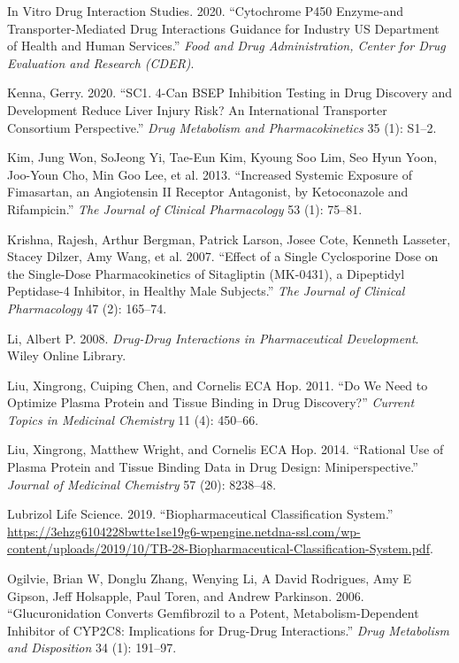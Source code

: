 \documentclass[
  11pt,
  krantz2, a4paper, twoside]{krantz}
\newlength{\cslhangindent}
\newenvironment{CSLReferences}[2] %
 {\begin{list}{}{%
  \setlength{\itemindent}{0pt}
  \setlength{\leftmargin}{0pt}
  \setlength{\parsep}{0pt}
  \ifodd #1
   \setlength{\leftmargin}{\cslhangindent}
   \setlength{\itemindent}{-1\cslhangindent}
  \fi
  \setlength{\itemsep}{#2\baselineskip}}}
 {\end{list}}
\begin{document}
\begin{CSLReferences}{1}{0}
In Vitro Drug Interaction Studies. 2020. {``Cytochrome P450 Enzyme-and Transporter-Mediated Drug Interactions Guidance for Industry US Department of Health and Human Services.''} \emph{Food and Drug Administration, Center for Drug Evaluation and Research (CDER)}.

Kenna, Gerry. 2020. {``SC1. 4-Can BSEP Inhibition Testing in Drug Discovery and Development Reduce Liver Injury Risk? An International Transporter Consortium Perspective.''} \emph{Drug Metabolism and Pharmacokinetics} 35 (1): S1--2.

Kim, Jung Won, SoJeong Yi, Tae-Eun Kim, Kyoung Soo Lim, Seo Hyun Yoon, Joo-Youn Cho, Min Goo Lee, et al. 2013. {``Increased Systemic Exposure of Fimasartan, an Angiotensin II Receptor Antagonist, by Ketoconazole and Rifampicin.''} \emph{The Journal of Clinical Pharmacology} 53 (1): 75--81.

Krishna, Rajesh, Arthur Bergman, Patrick Larson, Josee Cote, Kenneth Lasseter, Stacey Dilzer, Amy Wang, et al. 2007. {``Effect of a Single Cyclosporine Dose on the Single-Dose Pharmacokinetics of Sitagliptin (MK-0431), a Dipeptidyl Peptidase-4 Inhibitor, in Healthy Male Subjects.''} \emph{The Journal of Clinical Pharmacology} 47 (2): 165--74.

Li, Albert P. 2008. \emph{Drug-Drug Interactions in Pharmaceutical Development}. Wiley Online Library.

Liu, Xingrong, Cuiping Chen, and Cornelis ECA Hop. 2011. {``Do We Need to Optimize Plasma Protein and Tissue Binding in Drug Discovery?''} \emph{Current Topics in Medicinal Chemistry} 11 (4): 450--66.

Liu, Xingrong, Matthew Wright, and Cornelis ECA Hop. 2014. {``Rational Use of Plasma Protein and Tissue Binding Data in Drug Design: Miniperspective.''} \emph{Journal of Medicinal Chemistry} 57 (20): 8238--48.

Lubrizol Life Science. 2019. {``Biopharmaceutical Classification System.''} \url{https://3ehzg6104228bwtte1se19g6-wpengine.netdna-ssl.com/wp-content/uploads/2019/10/TB-28-Biopharmaceutical-Classification-System.pdf}.

Ogilvie, Brian W, Donglu Zhang, Wenying Li, A David Rodrigues, Amy E Gipson, Jeff Holsapple, Paul Toren, and Andrew Parkinson. 2006. {``Glucuronidation Converts Gemfibrozil to a Potent, Metabolism-Dependent Inhibitor of CYP2C8: Implications for Drug-Drug Interactions.''} \emph{Drug Metabolism and Disposition} 34 (1): 191--97.


\end{CSLReferences}
\end{document}
